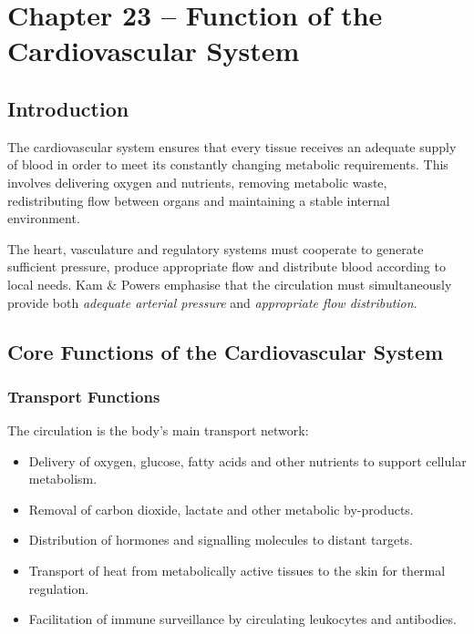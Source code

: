 \documentclass[11pt,a4paper]{article}
\begin{document}

\section{Chapter 23 – Function of the Cardiovascular System}

\subsection{Introduction}

The cardiovascular system ensures that every tissue receives an adequate supply of blood in order to meet its constantly changing metabolic requirements. This involves delivering oxygen and nutrients, removing metabolic waste, redistributing flow between organs and maintaining a stable internal environment.

The heart, vasculature and regulatory systems must cooperate to generate sufficient pressure, produce appropriate flow and distribute blood according to local needs. Kam \& Powers emphasise that the circulation must simultaneously provide both \emph{adequate arterial pressure} and \emph{appropriate flow distribution}.

\subsection{Core Functions of the Cardiovascular System}

\subsubsection{Transport Functions}

The circulation is the body's main transport network:
\begin{itemize}
  \item Delivery of oxygen, glucose, fatty acids and other nutrients to support cellular metabolism.
  \item Removal of carbon dioxide, lactate and other metabolic by-products.
  \item Distribution of hormones and signalling molecules to distant targets.
  \item Transport of heat from metabolically active tissues to the skin for thermal regulation.
  \item Facilitation of immune surveillance by circulating leukocytes and antibodies.
\end{itemize}
\end{document}
